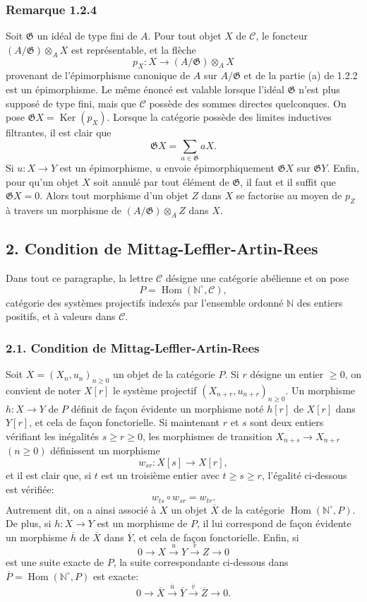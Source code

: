 \documentclass[11pt]{article}
\providecommand{\NN}{\mathbb{N}}
\DeclareMathOperator{\Hom}{Hom}
\providecommand{\Ker}{\operatorname{Ker}}
\providecommand{\Hom}{\operatorname{Hom}}
\providecommand{\NN}{\mathbb N}
\providecommand{\cC}{\mathcal C}
\providecommand{\cG}{\mathfrak G}
\providecommand{\Ker}{\operatorname{Ker}}
\providecommand{\Ker}{\operatorname{Ker}}
\providecommand{\cC}{\mathcal C}
\providecommand{\Hom}{\operatorname{Hom}}
\begin{document}
\subsubsection*{Remarque 1.2.4}
Soit $\cG$ un idéal de type fini de $A$. Pour tout objet $X$ de $\cC$, le foncteur $(A/\cG)\otimes_A X$ est représentable, et la flèche
\[
p_X:X\longrightarrow (A/\cG)\otimes_A X
\]
provenant de l'épimorphisme canonique de $A$ sur $A/\cG$ et de la partie (a) de 1.2.2 est un épimorphisme. Le même énoncé est valable lorsque l'idéal $\cG$ n'est plus supposé de type fini, mais que $\cC$ possède des sommes directes quelconques. On pose $\cG X=\Ker(p_X)$. Lorsque la catégorie possède des limites inductives filtrantes, il est clair que
\[
\cG X=\sum_{a\in\cG}aX.
\]
Si $u:X\to Y$ est un épimorphisme, $u$ envoie épimorphiquement $\cG X$ sur $\cG Y$. Enfin, pour qu'un objet $X$ soit annulé par tout élément de $\cG$, il faut et il suffit que $\cG X=0$. Alors tout morphisme d'un objet $Z$ dans $X$ se factorise au moyen de $p_Z$ à travers un morphisme de $(A/\cG)\otimes_A Z$ dans $X$.

\subsection*{2. Condition de Mittag-Leffler-Artin-Rees}
Dans tout ce paragraphe, la lettre $\cC$ désigne une catégorie abélienne et on pose
\[
P=\Hom(\NN^\circ,\cC),
\]
catégorie des systèmes projectifs indexés par l'ensemble ordonné $\NN$ des entiers positifs, et à valeurs dans $\cC$.

\subsubsection*{2.1. Condition de Mittag-Leffler-Artin-Rees}
Soit $X=(X_n,u_n)_{n\ge0}$ un objet de la catégorie $P$. Si $r$ désigne un entier $\ge0$, on convient de noter $X[r]$ le système projectif $(X_{n+r},u_{n+r})_{n\ge0}$. Un morphisme $h:X\to Y$ de $P$ définit de façon évidente un morphisme noté $h[r]$ de $X[r]$ dans $Y[r]$, et cela de façon fonctorielle. Si maintenant $r$ et $s$ sont deux entiers vérifiant les inégalités $s\ge r\ge0$, les morphismes de transition $X_{n+s}\to X_{n+r}$ $(n\ge0)$ définissent un morphisme
\[
w_{sr}:X[s]\longrightarrow X[r],
\]
et il est clair que, si $t$ est un troisième entier avec $t\ge s\ge r$, l'égalité ci-dessous est
vérifiée:
\[
w_{ts}\circ w_{sr}=w_{tr}.
\]
Autrement dit, on a ainsi associé à $X$ un objet $\overline X$ de la catégorie $\Hom(\NN^\circ,P)$. De plus, si $h:X\to Y$ est un morphisme de $P$, il lui correspond de façon évidente un morphisme $\overline h$ de $\overline X$ dans $\overline Y$, et cela de façon fonctorielle. Enfin, si
\[
0\longrightarrow X\stackrel{u}{\longrightarrow}Y\stackrel{v}{\longrightarrow}Z\longrightarrow0
\]
est une suite exacte de $P$, la suite correspondante ci-dessous dans $\overline P=\Hom(\NN^\circ,P)$ est exacte:
\[
0\longrightarrow\overline X\stackrel{\overline u}{\longrightarrow}\overline Y\stackrel{\overline v}{\longrightarrow}\overline Z\longrightarrow0.
\]
\end{document}
